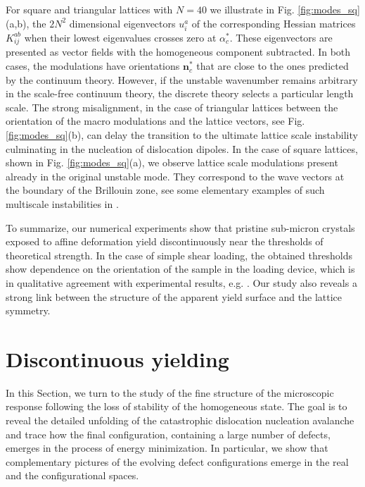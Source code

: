 \documentclass[CRPHYS,Unicode,manuscript]{cedram}
\begin{document}
For square and triangular lattices with  $N=40$ we illustrate in Fig. \ref{fig:modes_sq}(a,b),   the $2N^2$ dimensional eigenvectors $u_i^a$ of the corresponding Hessian matrices $K^{ab}_{ij}$  when their lowest eigenvalues  crosses zero at $\alpha_c^*$. These eigenvectors are presented as vector fields with the homogeneous component subtracted. In both cases, the modulations have orientations $\pmb n_c^*$ that are close to the ones predicted by the continuum theory. However, if the unstable wavenumber remains arbitrary in the scale-free continuum theory, the discrete theory selects a particular length scale. The strong misalignment, in the case of triangular lattices between the orientation of the macro modulations and the lattice vectors, see Fig. \ref{fig:modes_sq}(b), can delay the transition to the ultimate lattice scale instability culminating in the nucleation of dislocation dipoles. In the case of square lattices, shown in Fig. \ref{fig:modes_sq}(a), we observe lattice scale modulations present already in the original unstable mode.  They correspond to the wave vectors at the boundary of the Brillouin zone, see some elementary examples of such multiscale instabilities in \cite{Truskinovsky2005-gx,Bertoldi2008-au}. 


To summarize, our numerical experiments show that pristine sub-micron crystals exposed to affine deformation yield discontinuously near the thresholds of theoretical strength. In the case of simple shear loading,  the obtained thresholds show dependence on the orientation of the sample in the loading device, which is in qualitative agreement with experimental results, e.g.  \cite{Ziegenhain2010-tu,Bagheripoor2020-qm}.  Our study also reveals a strong link between  the structure of the apparent yield surface and  the lattice symmetry. 


\section{Discontinuous yielding}
 
In this Section, we  turn to the study of the fine structure of the microscopic response  following the loss of stability of the homogeneous state. The goal is to reveal the detailed unfolding of the catastrophic dislocation nucleation avalanche and trace how the final configuration, containing a large number of defects, emerges in the process of energy minimization. In particular, we show that complementary pictures of the evolving defect configurations emerge in the real and the configurational spaces. 
\end{document}
